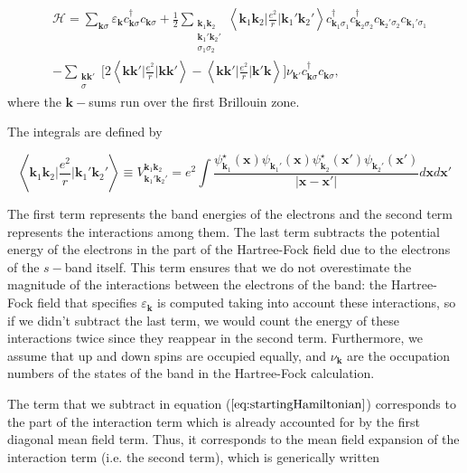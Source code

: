 \begin{equation}\label{eq:startingHamiltonian}
\begin{split}
&\mathcal{H} = \sum_{\bm k \sigma} \varepsilon_{\bm k} c_{\bm k \sigma}^\dagger c_{\bm k \sigma} + \frac{1}{2} \sum_{ \substack{\bm k_1 \bm k_2 \\ \bm k_1' \bm k_2' \\ \sigma_1 \sigma_2 } } \left\langle \bm k_1 \bm k_2 \bigg| \frac{e^2}{r} \bigg| \bm k_1' \bm k_2' \right\rangle 
 c_{\bm k_1 \sigma_1}^\dagger c_{\bm k_2 \sigma_2}^\dagger c_{\bm k_2' \sigma_2} c_{\bm k_1' \sigma_1} \\
 &- \sum_{ \substack{\bm k \bm k' \\ \sigma} } \bigg[ 2 \left\langle \bm k \bm k' \bigg| \frac{e^2}{r} \bigg| \bm k \bm k' \right\rangle - \left\langle \bm k \bm k' \bigg| \frac{e^2}{r} \bigg| \bm k' \bm k \right\rangle \bigg] \nu_{\bm k'} c_{\bm k \sigma}^\dagger c_{\bm k \sigma} ,
\end{split}
\end{equation}
where the $\bm k-$sums run over the first Brillouin zone.

The integrals are defined by

\begin{equation}\label{eq:integrals}
\left\langle \bm k_1 \bm k_2 \bigg| \frac{e^2}{r} \bigg| \bm k_1' \bm k_2' \right\rangle \equiv V^{\bm k_1 \bm k_2}_{\bm k_1' \bm k_2'}  =  e^2 \int \frac{\psi_{\bm k_1}^\star (\bm x) \psi_{\bm k_1'} (\bm x) \psi_{\bm k_2}^\star (\bm x') \psi_{\bm k_2'}(\bm x') }{| \bm x - \bm x' |} d\bm x d\bm x'
\end{equation}

The first term represents the band energies of the electrons and the second term represents the interactions among them.
The last term subtracts the potential energy of the electrons in the part of the Hartree-Fock field due to the electrons of the $s-$band itself.
This term ensures that we do not overestimate the magnitude of the interactions between the electrons of the band: the Hartree-Fock field that specifies $\varepsilon_{\bm k}$ is computed taking into account these interactions, so if we didn't subtract the last term, we would count the energy of these interactions twice since they reappear in the second term.
Furthermore, we assume that up and down spins are occupied equally, and $\nu_{\bm k}$ are the occupation numbers of the states of the band in the Hartree-Fock calculation. 

The term that we subtract in equation ($\ref{eq:startingHamiltonian}$) corresponds to the part of the interaction term which is already accounted for by the first diagonal mean field term.
Thus, it corresponds to the mean field expansion of the interaction term (i.e. the second term), which is generically written

